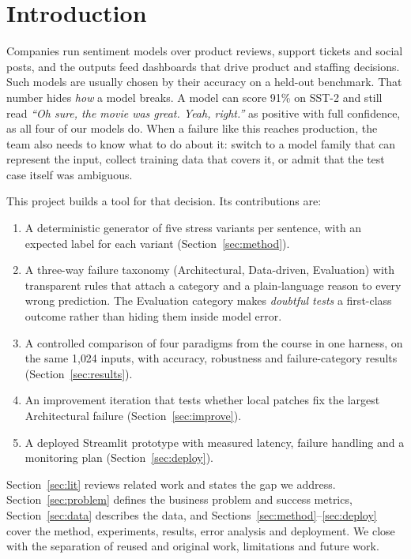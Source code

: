\documentclass[conference]{IEEEtran}
\newcommand{\ex}[1]{\textit{``#1''}}
\begin{document}
\section{Introduction}
Companies run sentiment models over product reviews, support tickets and social posts, and the
outputs feed dashboards that drive product and staffing decisions. Such models are usually chosen
by their accuracy on a held-out benchmark. That number hides \emph{how} a model breaks. A model can
score 91\% on SST-2 and still read \ex{Oh sure, the movie was great. Yeah, right.} as positive with
full confidence, as all four of our models do. When a failure like this reaches production, the
team also needs to know what to do about it: switch to a model family that can represent the
input, collect training data that covers it, or admit that the test case itself was ambiguous.

This project builds a tool for that decision. Its contributions are:
\begin{enumerate}
  \item A deterministic generator of five stress variants per sentence, with an expected label for
        each variant (Section~\ref{sec:method}).
  \item A three-way failure taxonomy (Architectural, Data-driven, Evaluation) with transparent rules
        that attach a category and a plain-language reason to every wrong prediction. The
        Evaluation category makes \emph{doubtful tests} a first-class outcome rather than hiding
        them inside model error.
  \item A controlled comparison of four paradigms from the course in one harness, on the same
        1{,}024 inputs, with accuracy, robustness and failure-category results
        (Section~\ref{sec:results}).
  \item An improvement iteration that tests whether local patches fix the largest Architectural
        failure (Section~\ref{sec:improve}).
  \item A deployed Streamlit prototype with measured latency, failure handling and a monitoring
        plan (Section~\ref{sec:deploy}).
\end{enumerate}

Section~\ref{sec:lit} reviews related work and states the gap we address.
Section~\ref{sec:problem} defines the business problem and success metrics,
Section~\ref{sec:data} describes the data, and Sections~\ref{sec:method}--\ref{sec:deploy} cover
the method, experiments, results, error analysis and deployment. We close with the separation of
reused and original work, limitations and future work.
\end{document}
